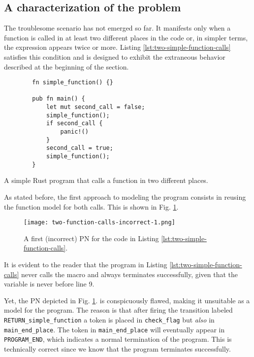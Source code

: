 \documentclass[../Thesis.tex]{subfiles}
\begin{document}
\subsection{A characterization of the problem}

The troublesome scenario has not emerged so far.
It manifests only when a function is called
in at least two different places in the code or,
in simpler terms, the expression  appears twice or more.
Listing \ref{lst:two-simple-function-calls} satisfies this condition
and is designed to exhibit
the extraneous behavior described at the beginning of the section.

\begin{listing}
    \begin{verbatim}
        fn simple_function() {}

        pub fn main() {
            let mut second_call = false;
            simple_function();
            if second_call {
                panic!()
            }
            second_call = true;
            simple_function();
        }
    \end{verbatim}
    \caption{A simple Rust program that calls a function in two different places.}
    \label{lst:two-simple-function-calls}
\end{listing}

As stated before, the first approach to modeling the program consists
in reusing the function model for both calls.
This is shown in Fig. \ref{fig:two-function-calls-incorrect-1}.

\begin{figure}[!htb]
    \centering
    \texttt{[image: two-function-calls-incorrect-1.png]}
    \caption{A first (incorrect) \acrshort{PN} for the code
        in Listing \ref{lst:two-simple-function-calls}.}
    \label{fig:two-function-calls-incorrect-1}
\end{figure}

It is evident to the reader that
the program in Listing \ref{lst:two-simple-function-calls}
never calls the  macro and always terminates successfully,
given that the variable 
is never  before line 9.

Yet, the \acrshort{PN} depicted in Fig. \ref{fig:two-function-calls-incorrect-1}.
is conspicuously flawed, making it unsuitable as a model for the program.
The reason is that after firing the transition labeled \texttt{RETURN\_simple\_function}
a token is placed in \texttt{check\_flag} but \emph{also} in \texttt{main\_end\_place}.
The token in \texttt{main\_end\_place} will eventually appear in \texttt{PROGRAM\_END},
which indicates a normal termination of the program.
This is technically correct since we know that the program terminates successfully.
\end{document}
